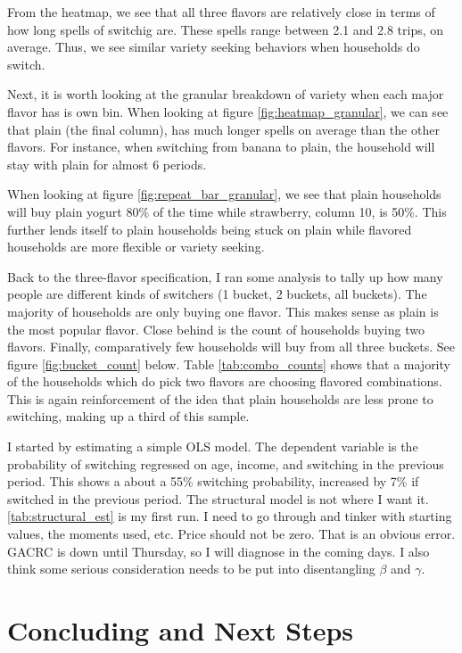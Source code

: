 \documentclass[11pt]{article}
\theoremstyle{definition}
\theoremstyle{remark}
\begin{document}
From the heatmap, we see that all three flavors are relatively close in terms of how long spells of switchig are. These spells range between 2.1 and 2.8 trips, on average. Thus, we see similar variety seeking behaviors when households do switch.

Next, it is worth looking at the granular breakdown of variety when each major flavor has is own bin. When looking at figure \ref{fig:heatmap_granular}, we can see that plain (the final column), has much longer spells on average than the other flavors. For instance, when switching from banana to plain, the household will stay with plain for almost 6 periods. 

When looking at figure \ref{fig:repeat_bar_granular}, we see that plain households will buy plain yogurt 80\% of the time while strawberry, column 10, is 50\%. This further lends itself to plain households being stuck on plain while flavored households are more flexible or variety seeking.

Back to the three-flavor specification, I ran some analysis to tally up how many people are different kinds of switchers (1 bucket, 2 buckets, all buckets). The majority of households are only buying one flavor. This makes sense as plain is the most popular flavor. Close behind is the count of households buying two flavors. Finally, comparatively few households will buy from all three buckets. See figure \ref{fig:bucket_count} below. Table \ref{tab:combo_counts} shows that a majority of the households which do pick two flavors are choosing flavored combinations. This is again reinforcement of the idea that plain households are less prone to switching, making up a third of this sample. 

I started by estimating a simple OLS model. The dependent variable is the probability of switching regressed on age, income, and switching in the previous period. This shows a about a 55\% switching probability, increased by 7\% if switched in the previous period. The structural model is not where I want it. \ref{tab:structural_est} is my first run. I need to go through and tinker with starting values, the moments used, etc. Price should not be zero. That is an obvious error. GACRC is down until Thursday, so I will diagnose in the coming days. I also think some serious consideration needs to be put into disentangling $\beta$ and $\gamma$.


\section{Concluding and Next Steps}
\end{document}
